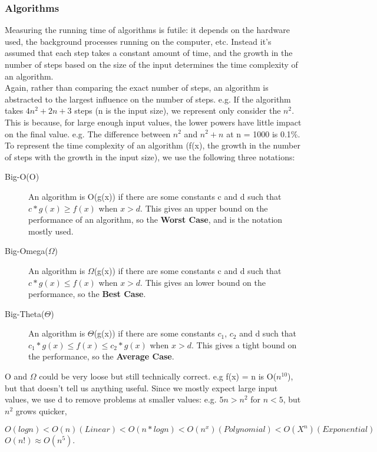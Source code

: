 \subsubsection{Algorithms}
Measuring the running time of algorithms is futile: it depends on the hardware used, the background processes running on the computer, etc. Instead it's assumed that each step takes a constant amount of time, and the growth in the number of steps based on the size of the input determines the time complexity of an algorithm. \\ 
Again, rather than comparing the exact number of steps, an algorithm is abstracted to the largest influence on the number of steps. e.g. If the algorithm takes \(4n^2+2n+3\) steps (n is the input size), we represent only consider the $n^2$. This is because, for large enough input values, the lower powers have little impact on the final value. e.g. The difference between $n^2$ and $n^2+n$ at n = 1000 is 0.1\%. 
\newpage
To represent the time complexity of an algorithm (f(x), the growth in the number of steps with the growth in the input size), we use the following three notations:
\begin{description}
    \item[Big-O(O)] An algorithm is O(g(x)) if there are some constants c and d such that \(c*g(x) \geq f(x)\) when $x > d$. This gives an upper bound on the performance of an algorithm, so the \textbf{Worst Case}, and is the notation mostly used.
    \item[Big-Omega($\Omega$)] An algorithm is $\Omega$(g(x)) if there are some constants c and d such that \(c*g(x) \leq f(x)\) when $x > d$. This gives an lower bound on the performance, so the \textbf{Best Case}.
    \item[Big-Theta($\Theta$)] An algorithm is $\Theta$(g(x)) if there are some constants $c_1$, $c_2$ and d such that \(c_1*g(x) \leq f(x) \leq c_2*g(x)\) when $x > d$. This gives a tight bound on the performance, so the \textbf{Average Case}.    
\end{description}
O and $\Omega$ could be very loose but still technically correct. e.g f(x) = n  is O($n^{10}$), but that doesn't tell us anything useful. Since we mostly expect large input values, we use d to remove problems at smaller values: e.g. \(5n > n^2\) for \(n < 5\), but $n^2$ grows quicker,

\begin{center}
   \( O(log n) < O(n) (Linear) < O(n * log n) < O(n^x) (Polynomial) < O(X^n) (Exponential) \) \\
    \(O(n!) \approx O(n^5). \)
\end{center}

